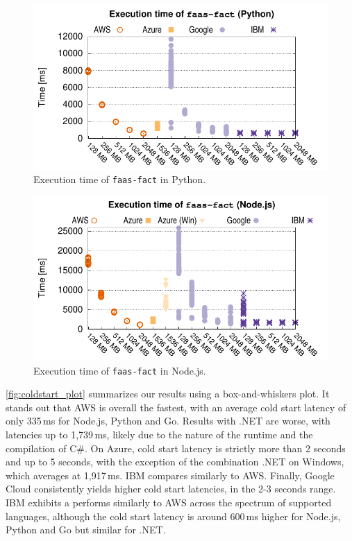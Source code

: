 \begin{figure}[!b]
\centering
\includegraphics[scale=0.7]{bilder/general_python/cpufact.pdf}
\caption{Execution time of \texttt{faas-fact} in Python.}
\label{fig:general_python_plot}
\end{figure}

\begin{figure}[!b]
\centering
\includegraphics[scale=0.7]{bilder/general_node/cpufact.pdf}
\caption{Execution time of \texttt{faas-fact} in Node.js.}
\label{fig:general_node_plot}
\end{figure}

\autoref{fig:coldstart_plot} summarizes our results using a box-and-whiskers plot.
It stands out that \gls{AWS} is overall the fastest, with an average cold start latency of only 335\,ms for Node.js, Python and Go. 
Results with .NET are worse, with latencies up to 1,739\,ms, likely due to the nature of the runtime and the compilation of C\#. 
On Azure, cold start latency is strictly more than 2 seconds and up to 5 seconds, with the exception of the combination .NET on Windows, which averages at 1,917\,ms. 
IBM compares similarly to \gls{AWS}.
Finally, Google Cloud consistently yields higher cold start latencies, in the 2-3 seconds range. 
\gls{IBM} exhibits a performs similarly to \gls{AWS} across the spectrum of supported languages, although the cold start latency is around 600\,ms higher for Node.js, Python and Go but similar for .NET.

